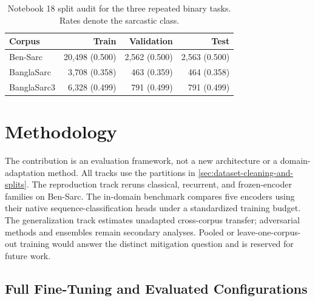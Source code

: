 \documentclass{ieeeaccess}
\begin{document}
\begin{table}[!t]
\centering
\caption{Notebook 18 split audit for the three repeated binary tasks. Rates denote the sarcastic class.}
\label{tab:split-audit}
\footnotesize
\setlength{\tabcolsep}{3pt}
\begin{tabular}{@{}lrrr@{}}
\toprule
\textbf{Corpus} & \textbf{Train} & \textbf{Validation} & \textbf{Test} \\
\midrule
Ben-Sarc & 20{,}498 (0.500) & 2{,}562 (0.500) & 2{,}563 (0.500) \\
BanglaSarc & 3{,}708 (0.358) & 463 (0.359) & 464 (0.358) \\
BanglaSarc3 & 6{,}328 (0.499) & 791 (0.499) & 791 (0.499) \\
\bottomrule
\end{tabular}
\end{table}


\section{Methodology}
\label{sec:methodology}

The contribution is an evaluation framework, not a new architecture or a domain-adaptation method. All tracks use the partitions in \cref{sec:dataset-cleaning-and-splits}. The reproduction track reruns classical, recurrent, and frozen-encoder families on Ben-Sarc. The in-domain benchmark compares five encoders using their native sequence-classification heads under a standardized training budget. The generalization track estimates unadapted cross-corpus transfer; adversarial methods and ensembles remain secondary analyses. Pooled or leave-one-corpus-out training would answer the distinct mitigation question and is reserved for future work.

\subsection{Full Fine-Tuning and Evaluated Configurations}
\label{sec:proposed-architecture}
\end{document}
